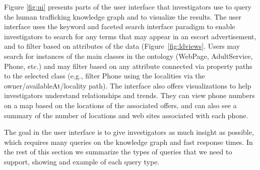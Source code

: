 Figure \ref{fig:ui} presents parts of the user interface that investigators use to query the human trafficking knowledge graph and to visualize the results.
The user interface uses the keyword and faceted search interface paradigm to enable investigators to search for any terms that may appear in an escort advertisement, and to filter based on attributes of the data (Figure~\ref{fig:ldviews}.
Users may search for instances of the main classes in the ontology (WebPage, AdultService, Phone, etc.) and may filter based on any attribute connected via property paths to the selected class (e.g., filter Phone using the localities via the owner/availableAt/locality path).
The interface also offers visualizations to help investigators understand relationships and trends.
They can view phone numbers on a map based on the locations of the associated offers, and can also see a summary of the number of locations and web sites associated with each phone.

The goal in the user interface is to give investigators as much insight as possible, which requires many queries on the knowledge graph and fast response times.
In the rest of this section we summarize the types of queries that we need to support, showing and example of each query type.